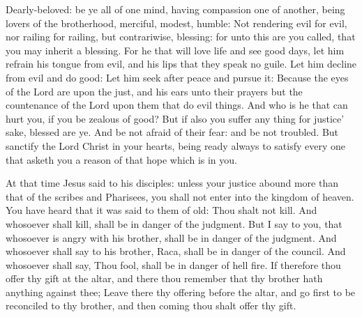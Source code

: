 \begin{multicols}{2}
Dearly-beloved: be ye all of one mind, having compassion one of
another, being lovers of the brotherhood, merciful, modest, humble:
Not rendering evil for evil, nor railing for railing, but
contrariwise, blessing: for unto this are you called, that you may
inherit a blessing.
For he that will love life and see good days, let him refrain his
tongue from evil, and his lips that they speak no guile.
Let him decline from evil and do good: Let him seek after peace
and pursue it:
Because the eyes of the Lord are upon the just, and his ears unto
their prayers but the countenance of the Lord upon them that do evil
things.
And who is he that can hurt you, if you be zealous of good?
But if also you suffer any thing for justice' sake, blessed are
ye. And be not afraid of their fear: and be not troubled.
But sanctify the Lord Christ in your hearts, being ready always to
satisfy every one that asketh you a reason of that hope which is in you.




At that time Jesus said to his disciples:
unless your justice abound more than that of
the scribes and Pharisees, you shall not enter into the kingdom of
heaven.
You have heard that it was said to them of old: Thou shalt not
kill. And whosoever shall kill, shall be in danger of the judgment.
But I say to you, that whosoever is angry with his brother, shall
be in danger of the judgment. And whosoever shall say to his brother,
Raca, shall be in danger of the council. And whosoever shall say, Thou
fool, shall be in danger of hell fire.
If therefore thou offer thy gift at the altar, and there thou
remember that thy brother hath anything against thee;
Leave there thy offering before the altar, and go first to be
reconciled to thy brother, and then coming thou shalt offer thy gift.



\end{multicols}
